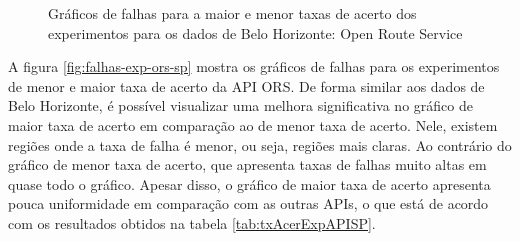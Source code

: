 \begin{figure}[ht]
  \caption{Gráficos de falhas para a maior e menor taxas de acerto dos experimentos para os dados de Belo Horizonte: Open Route Service}
  \label{fig:falhas-exp-ors-bh}
\end{figure}

A figura \ref{fig:falhas-exp-ors-sp} mostra os gráficos de falhas para os experimentos de menor e maior taxa de acerto da API ORS. De forma similar aos dados de Belo Horizonte, é possível visualizar uma melhora significativa no gráfico de maior taxa de acerto em comparação ao de menor taxa de acerto. Nele, existem regiões onde a taxa de falha é menor, ou seja, regiões mais claras. Ao contrário do gráfico de menor taxa de acerto, que apresenta taxas de falhas muito altas em quase todo o gráfico. Apesar disso, o gráfico de maior taxa de acerto apresenta pouca uniformidade em comparação com as outras APIs, o que está de acordo com os resultados obtidos na tabela \ref{tab:txAcerExpAPISP}.
 
